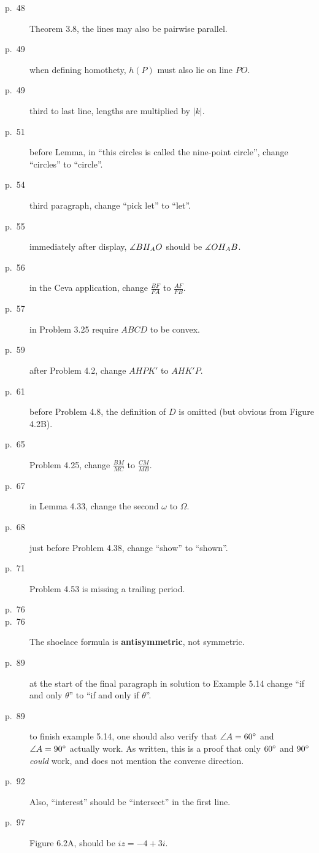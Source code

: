 \documentclass[11pt]{scrartcl}
\begin{document}
\begin{description}
\item[p.\  48] Theorem 3.8, the lines may also be pairwise parallel.
\item[p.\  49] when defining homothety, $h(P)$ must also lie on line $PO$.
\item[p.\  49] third to last line, lengths are multiplied by $|k|$.
\item[p.\  51] before Lemma, in ``this circles is called the nine-point circle'',
  change ``circles'' to ``circle''.
\item[p.\  54] third paragraph, change ``pick let'' to ``let''.
\item[p.\  55] immediately after display, $\measuredangle BH_AO$ should be $\measuredangle OH_AB$.
\item[p.\  56] in the Ceva application, change $\frac{BF}{FA}$ to $\frac{AF}{FB}$.
\item[p.\  57] in Problem 3.25 require $ABCD$ to be convex.
\item[p.\  59] after Problem 4.2, change $AHPK'$ to $AHK'P$.
\item[p.\  61] before Problem 4.8, the definition of $D$ is omitted (but obvious from Figure 4.2B).
\item[p.\  65] Problem 4.25, change $\frac{BM}{MC}$ to $\frac{CM}{MB}$.
\item[p.\  67] in Lemma 4.33, change the second $\omega$ to $\Omega$.
\item[p.\  68] just before Problem 4.38, change ``show'' to ``shown''.
\item[p.\  71] Problem 4.53 is missing a trailing period.
\item[p.\  76] 
\item[p.\  76] The shoelace formula is \textbf{antisymmetric}, not symmetric.
\item[p.\  89] at the start of the final paragraph in solution to Example 5.14
  change ``if and only $\theta$'' to ``if and only if $\theta$''.
\item[p.\  89] to finish example 5.14, one should also verify that $\angle A = 60^\circ$
  and $\angle A = 90^\circ$ actually work.
  As written, this is a proof that only $60^\circ$ and $90^\circ$ \emph{could} work,
  and does not mention the converse direction.
\item[p.\  92] 
  Also, ``interest'' should be ``intersect'' in the first line.
\item[p.\  97] Figure 6.2A, should be $iz = -4+3i$.

\end{description}
\end{document}
